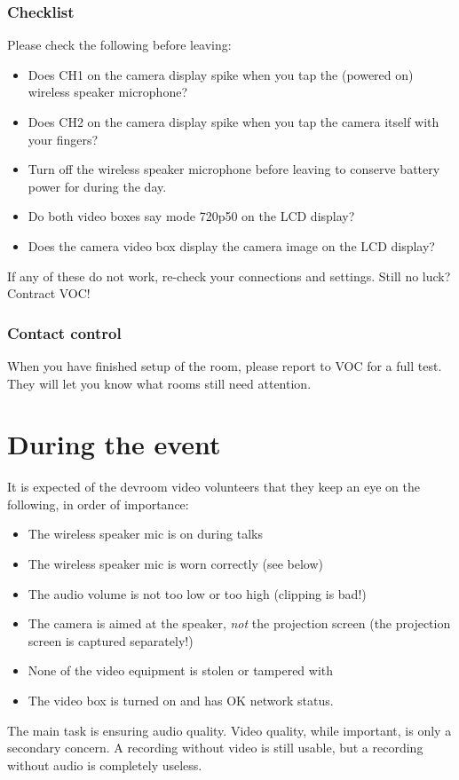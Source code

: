 \documentclass{article}
\begin{document}
\subsubsection{Checklist}
Please check the following before leaving:
\begin{itemize}
  \item Does CH1 on the camera display spike when you tap the (powered on) wireless speaker microphone?
  \item Does CH2 on the camera display spike when you tap the camera itself with your fingers?
  \item Turn off the wireless speaker microphone before leaving to conserve battery power for during the day.
  \item Do both video boxes say mode 720p50 on the LCD display?
  \item Does the camera video box display the camera image on the LCD display?
\end{itemize}

If any of these do not work, re-check your connections and settings. Still no luck? Contract VOC!

\subsubsection{Contact control}
When you have finished setup of the room, please report to VOC for a full test.
They will let you know what rooms still need attention.

\section{During the event}
It is expected of the devroom video volunteers that they keep an eye on the following, in order of importance:
\begin{itemize}
  \item The wireless speaker mic is on during talks
  \item The wireless speaker mic is worn correctly (see below)
  \item The audio volume is not too low or too high (clipping is bad!)
  \item The camera is aimed at the speaker, \emph{not} the projection screen (the projection screen is captured separately!)
  \item None of the video equipment is stolen or tampered with
  \item The video box is turned on and has OK network status.
\end{itemize}
The main task is ensuring audio quality. Video quality, while important, is only a secondary concern. A recording without video is still usable, but a recording without audio is completely useless.
\end{document}
